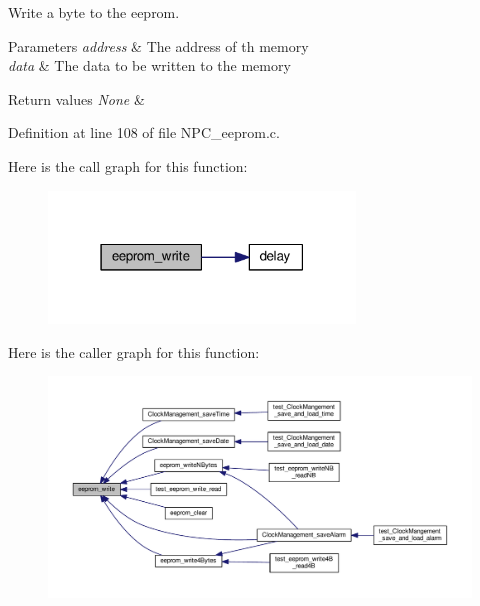 Write a byte to the eeprom. 


\begin{DoxyParams}{Parameters}
{\em address} & The address of th memory \\
\hline
{\em data} & The data to be written to the memory \\
\hline
\end{DoxyParams}

\begin{DoxyRetVals}{Return values}
{\em None} & \\
\hline
\end{DoxyRetVals}


Definition at line 108 of file N\+P\+C\+\_\+eeprom.\+c.



Here is the call graph for this function\+:\nopagebreak
\begin{figure}[H]
\begin{center}
\leavevmode
\includegraphics[width=231pt]{d2/de3/group___eeprom___trans_ga46c7b6081a89f96d53b6ebc0d0b6f60b_cgraph}
\end{center}
\end{figure}




Here is the caller graph for this function\+:
\nopagebreak
\begin{figure}[H]
\begin{center}
\leavevmode
\includegraphics[width=350pt]{d2/de3/group___eeprom___trans_ga46c7b6081a89f96d53b6ebc0d0b6f60b_icgraph}
\end{center}
\end{figure}


